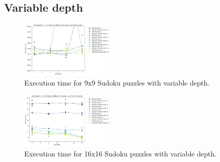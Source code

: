 \documentclass[a4paper,10pt]{article}
\begin{document}
\begin{multicols}{2}

\subsection{Variable depth}

\begin{figure}[H]
    \centering
    \includegraphics[width=0.4\textwidth]{9x9_var_depth.png}
    \caption{Execution time for 9x9 Sudoku puzzles with variable depth.}
    \label{fig:9x9_var_depth}
\end{figure}

\begin{figure}[H]
    \centering
    \includegraphics[width=0.4\textwidth]{16x16_var_depth.png}
    \caption{Execution time for 16x16 Sudoku puzzles with variable depth.}
    \label{fig:16x16_var_depth}
\end{figure}


\end{multicols}
\end{document}
